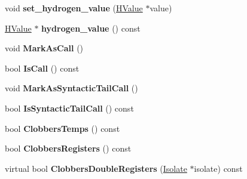 \begin{DoxyCompactItemize}
\item 
void {\bfseries set\+\_\+hydrogen\+\_\+value} (\hyperlink{classv8_1_1internal_1_1_h_value}{H\+Value} $\ast$value)\hypertarget{classv8_1_1internal_1_1_l_instruction_a68e2df77f5e5162bd8e6a70d3a4ca125}{}\label{classv8_1_1internal_1_1_l_instruction_a68e2df77f5e5162bd8e6a70d3a4ca125}

\item 
\hyperlink{classv8_1_1internal_1_1_h_value}{H\+Value} $\ast$ {\bfseries hydrogen\+\_\+value} () const \hypertarget{classv8_1_1internal_1_1_l_instruction_af71bb259ebbc0a2487cf692db58d2bfa}{}\label{classv8_1_1internal_1_1_l_instruction_af71bb259ebbc0a2487cf692db58d2bfa}

\item 
void {\bfseries Mark\+As\+Call} ()\hypertarget{classv8_1_1internal_1_1_l_instruction_a9dc545055b25ef6d6210176159e4110a}{}\label{classv8_1_1internal_1_1_l_instruction_a9dc545055b25ef6d6210176159e4110a}

\item 
bool {\bfseries Is\+Call} () const \hypertarget{classv8_1_1internal_1_1_l_instruction_a00e004b64fc7724c83aad55ac9530e0f}{}\label{classv8_1_1internal_1_1_l_instruction_a00e004b64fc7724c83aad55ac9530e0f}

\item 
void {\bfseries Mark\+As\+Syntactic\+Tail\+Call} ()\hypertarget{classv8_1_1internal_1_1_l_instruction_a72c62906028bed230decd2719d08a847}{}\label{classv8_1_1internal_1_1_l_instruction_a72c62906028bed230decd2719d08a847}

\item 
bool {\bfseries Is\+Syntactic\+Tail\+Call} () const \hypertarget{classv8_1_1internal_1_1_l_instruction_a2f5419706e2dbe5ab9cc774e3c2816c0}{}\label{classv8_1_1internal_1_1_l_instruction_a2f5419706e2dbe5ab9cc774e3c2816c0}

\item 
bool {\bfseries Clobbers\+Temps} () const \hypertarget{classv8_1_1internal_1_1_l_instruction_ae0d7f1fe3d3d67357050ddb2cd539d62}{}\label{classv8_1_1internal_1_1_l_instruction_ae0d7f1fe3d3d67357050ddb2cd539d62}

\item 
bool {\bfseries Clobbers\+Registers} () const \hypertarget{classv8_1_1internal_1_1_l_instruction_a1be40eb2a9feb7da6047a05f41e6fb5c}{}\label{classv8_1_1internal_1_1_l_instruction_a1be40eb2a9feb7da6047a05f41e6fb5c}

\item 
virtual bool {\bfseries Clobbers\+Double\+Registers} (\hyperlink{classv8_1_1internal_1_1_isolate}{Isolate} $\ast$isolate) const \hypertarget{classv8_1_1internal_1_1_l_instruction_acbdd958e836acbc67e53ae3de2b17149}{}\label{classv8_1_1internal_1_1_l_instruction_acbdd958e836acbc67e53ae3de2b17149}


\end{DoxyCompactItemize}
